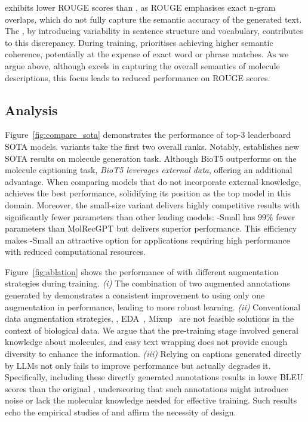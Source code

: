 \newmodel exhibits lower ROUGE scores than \oldmodel, as ROUGE emphasises exact n-gram overlaps, which do not fully capture the semantic accuracy of the generated text. 
The \newdataset, by introducing variability in sentence structure and vocabulary, contributes to this discrepancy. 
During training, \newmodel prioritises achieving higher semantic coherence, potentially at the expense of exact word or phrase matches. 
As we argue above, although \newmodel excels in capturing the overall semantics of molecule descriptions, this focus leads to reduced performance on ROUGE scores.


\subsection{Analysis}
\label{subsec:analysis}



Figure~\ref{fig:compare_sota} demonstrates the performance of top-$3$ leaderboard SOTA models.
\newmodel variants take the first two overall ranks. 
Notably, \newmodel establishes new SOTA results on molecule generation task. 
Although BioT5 outperforms \newmodel on the molecule captioning task, \emph{BioT5 leverages external data}, offering an additional advantage. 
When comparing models that do not incorporate external knowledge, \newmodel achieves the best performance, solidifying its position as the top model in this domain. 
% 
Moreover, the small-size variant delivers highly competitive results with significantly fewer parameters than other leading models: \newmodel-Small has $99\%$ fewer parameters than MolRecGPT but delivers superior performance. 
This efficiency makes \newmodel-Small an attractive option for applications requiring high performance with reduced computational resources.

% 

Figure~\ref{fig:ablation} shows the performance of \newmodel with different augmentation strategies during training. 
\emph{(i)} The combination of two augmented annotations generated by \pipeline demonstrates a consistent improvement to using only one augmentation in performance, leading to more robust learning. 
\emph{(ii)} Conventional data augmentation strategies, \eg, EDA~\cite{WZ19}, Mixup~\cite{ZCDL18} are not feasible solutions in the context of biological data. 
We argue that the pre-training stage involved general knowledge about molecules, and easy text wrapping does not provide enough diversity to enhance the information. 
\emph{(iii)} Relying on captions generated directly by LLMs not only fails to improve performance but actually degrades it.
Specifically, including these directly generated annotations results in lower BLEU scores than the original \oldmodel, underscoring that such annotations might introduce noise or lack the molecular knowledge needed for effective training.
Such results echo the empirical studies of \cite{ZZM24} and affirm the necessity of \pipeline design. 

